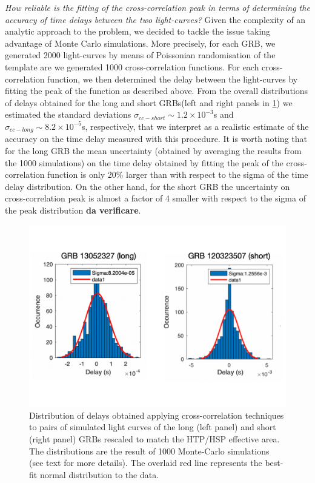\documentclass[]{spie}  %
\begin{document}
\emph{How reliable is the fitting of the cross-correlation peak in terms of determining the accuracy of time delays between the two light-curves?} Given the complexity of an analytic approach to the problem, we decided to tackle the issue taking advantage of Monte Carlo simulations. More precisely, for each GRB, we generated 2000 light-curves by means of Poissonian randomisation of the template are we generated 1000 cross-correlation functions. For each cross-correlation function, we then determined the delay between the light-curves by fitting the peak of the function as described above. From the overall distributions of delays obtained for the long and short GRBs(left and right panels in \ref{fig:xc_sigma}) we estimated the standard deviations $\sigma_{cc-short}\sim1.2\times10^{-3}$s and $\sigma_{cc-long}\sim 8.2\times10^{-5}$s, respectively, that we interpret as a realistic estimate of the accuracy on the time delay measured with this procedure. It is worth noting that for the long GRB the mean uncertainty (obtained by averaging the results from the 1000 simulations) on the time delay obtained by fitting the peak of the cross-correlation function is only 20\% larger than with respect to  the sigma of the time delay distribution. On the other hand, for the short GRB the uncertainty on cross-correlation peak is almost a factor of 4 smaller with respect to the sigma of the peak distribution \textbf{da verificare}.


\begin{figure}[h!]
\centering
\includegraphics[scale=0.45,angle=0]{sigma_cc_sim}
\vspace{-1cm}
\caption{Distribution of delays obtained applying cross-correlation techniques to pairs of simulated light curves of the long (left panel) and short (right panel) GRBs rescaled to match the HTP/HSP effective area. The distributions are the result of 1000 Monte-Carlo simulations (see text for more details). The overlaid red line represents the best-fit normal distribution to the data.} 
\label{fig:xc_sigma}
\end{figure}
\end{document}
